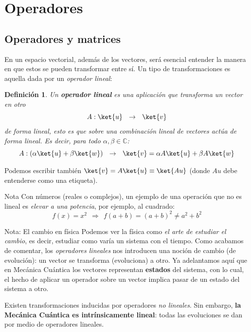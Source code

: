 \documentclass[a4paper,11pt]{book} %
\newtheorem{definicion_contador}{Definición}
\newcommand{\Definicion}[1]{
		\begin{mybox_gray2}{}
			\begin{definicion_contador}
				 #1 
			\end{definicion_contador} 
		\end{mybox_gray2}
	}
\numberwithin{equation}{chapter}
\begin{document}
	
	\section{Operadores}




		\subsection{Operadores y matrices}

En un espacio vectorial, además de los vectores, será esencial entender la manera en que estos se pueden transformar entre sí. Un tipo de transformaciones es aquella dada por un \textit{operador lineal}:
	\Definicion{
	Un \textbf{operador lineal }es una aplicación  que transforma un vector  en otro 
	\begin{equation}
	A: \ket{u} ~~\to ~~ \ket{v} 
	\end{equation}
de forma \textit{lineal}, esto es que sobre una \textit{combinación lineal} de vectores actúa de forma lineal. Es decir, para todo $\alpha,\beta \in {\mathbb C}$: 
	\begin{equation}
	A: (\alpha\ket{u} + \beta\ket{w})~~\to ~~ \ket{v} =\alpha A\ket{u} + \beta A\ket{w}
	\end{equation}   
	}
Podemos escribir también $\ket{v} = A\ket{u} \equiv \ket{Au}$ (donde $Au$ debe entenderse como una etiqueta).

\begin{mybox_blue}{Nota}
Con números (reales o complejos), un ejemplo de una operación que no es lineal es \textit{elevar a una potencia}, por ejemplo, al cuadrado:
	\begin{equation}
	f(x) = x^2 ~~ \Rightarrow ~~ f(a+b) = (a+b)^2 \neq a^2 + b^2
	\end{equation}
\end{mybox_blue}

	\begin{mybox_blue}{Nota: El cambio en física}
	Podemos ver la física como \textit{el arte de estudiar el cambio}, es decir, estudiar como varía un sistema con el tiempo. Como acabamos de comentar, los \textit{operadores lineales} nos introducen una noción de cambio (de evolución): un vector se transforma (evoluciona) a otro. Ya adelantamos aquí que en Mecánica Cuántica los vectores representan \textbf{estados} del sistema, con lo cual, el hecho de aplicar un operador sobre un vector implica pasar de un estado del sistema a otro. 
	\vspace{0.3cm}
	
	Existen transformaciones inducidas por operadores \textit{no lineales}. Sin embargo, \textbf{la Mecánica Cuántica es intrínsicamente lineal}: todas las evoluciones se dan por medio de operadores lineales.
	\end{mybox_blue}
\end{document}
